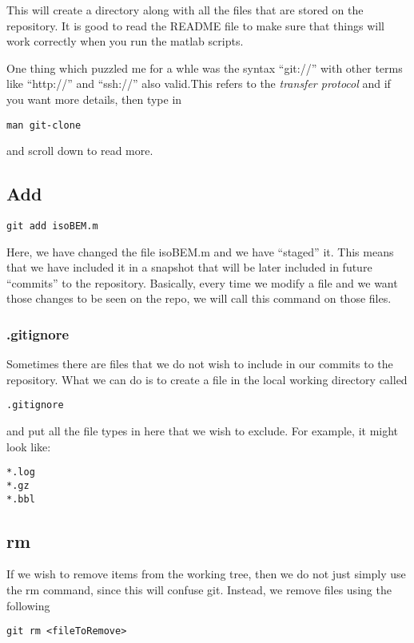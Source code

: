 \documentclass[a4paper, 10pt]{article}
\begin{document}
This will create a directory along with all the files that are stored on the repository. It is good to read the README file to make sure that things will work correctly when you run the matlab scripts.

One thing which puzzled me for a whle was the syntax ``git://'' with other terms like ``http://'' and ``ssh://'' also valid.This refers to the  \emph{transfer protocol} and if you want more details, then type in 
\begin{verbatim}
man git-clone
\end{verbatim}
and scroll down to read more.


\subsection*{Add}
\begin{Verbatim}
git add isoBEM.m
\end{Verbatim}

Here, we have changed the file isoBEM.m and we have ``staged'' it. This means that we have included it in a snapshot that will be later included in future ``commits'' to the repository. Basically, every time we modify a file and we want those changes to be seen on the repo, we will call this command on those files.

\subsubsection*{.gitignore}
\label{sec:.gitignore}

Sometimes there are files that we do not wish to include in our
commits to the repository. What we can do is to create a file in the
local working directory called 
\begin{verbatim}
.gitignore
\end{verbatim}
and put all the file types in here that we wish to exclude. For
example, it might look like:
\begin{verbatim}
*.log
*.gz
*.bbl
\end{verbatim}

\subsection*{rm}
\label{sec:gitrm}

If we wish to remove items from the working tree, then we do not just
simply use the rm command, since this will confuse git. Instead, we
remove files using the following
\begin{verbatim}
git rm <fileToRemove>
\end{verbatim}
\end{document}

